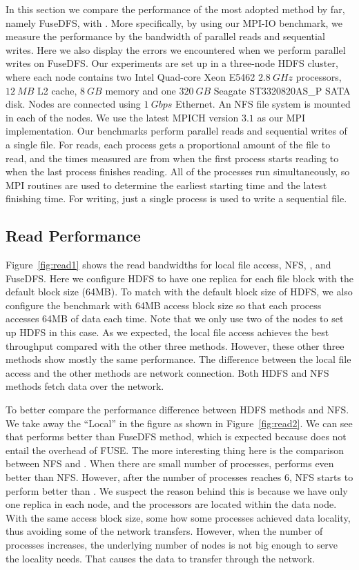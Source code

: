 In this section we compare the performance of the most adopted method by far,
namely FuseDFS, with {\proj}. More specifically, by using our MPI-IO benchmark,
we measure the performance by the bandwidth of parallel reads and sequential
writes. Here we also display the errors we encountered when we perform parallel
writes on FuseDFS. Our experiments are set up in a three-node HDFS cluster,
where each node contains two Intel Quad-core Xeon E5462 $2.8~GHz$ processors,
$12~MB$ L2 cache, $8~GB$ memory and one $320~GB$ Seagate ST3320820AS\_P SATA
disk. Nodes are connected using $1~Gbps$ Ethernet. An NFS file system is mounted
in each of the nodes. We use the latest MPICH
version $3.1$ as our MPI implementation. Our benchmarks perform parallel reads
and sequential writes of a single file. For reads, each process gets a proportional
amount of the file to read, and the times measured are from when the first process
starts reading to when the last process finishes reading. All of the processes run
simultaneously, so MPI routines are used to determine the earliest starting time
and the latest finishing time. For writing, just a single process is used to
write a sequential file.

\subsection{Read Performance}
Figure~\ref{fig:read1} shows the read bandwidths for local file access, NFS, {\proj},
and FuseDFS. Here we configure HDFS to have one replica for each file block with
the default block size (64MB). To match with the default block size of HDFS, we
also configure the benchmark with 64MB access block size so that each process
accesses 64MB of data each time. Note that we only use two of the nodes to set up
HDFS in this case. As we expected, the local file access achieves
the best throughput compared with the other three methods. However, these other three
methods show mostly the same performance. The
difference between the local file access and the other methods are network
connection. Both HDFS and NFS methods fetch data over the network.

To better compare the performance difference between HDFS methods and NFS. We
take away the ``Local'' in the figure as shown in Figure~\ref{fig:read2}. We 
can see that {\proj} performs better than FuseDFS method, which is expected
because {\proj} does not entail the overhead of FUSE. The more interesting thing
here is the comparison between NFS and {\proj}. When there are small
number of processes, {\proj} performs even better than NFS. However, after the
number of processes reaches 6, NFS starts to perform better than {\proj}. We
suspect the reason behind this is because we have only one replica in each node, and
the processors are located within the data node. With the same access block
size, some how some processes achieved data locality, thus avoiding some of the
network transfers. However, when the number of processes increases, the
underlying number of nodes is not big enough to serve the locality needs. That
causes the data to transfer through the network.

